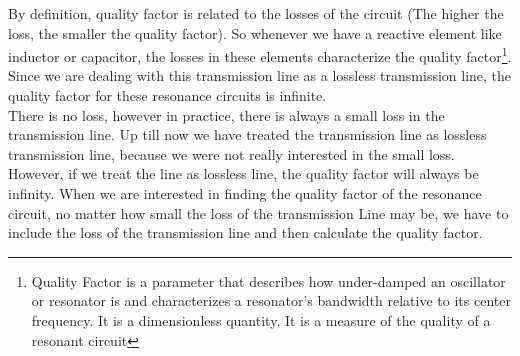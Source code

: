 By definition, quality factor is related to the losses of the circuit (The higher the loss, the smaller the quality factor). So whenever we have a reactive element like inductor or capacitor, the losses in these elements characterize the quality factor\footnote{Quality Factor is a parameter that describes how under-damped an oscillator or resonator is and characterizes a resonator's bandwidth relative to its center frequency. It is a dimensionless quantity.
It is a measure of the quality of a resonant circuit}. Since we are dealing with this transmission line as a lossless transmission line, the quality factor for these resonance circuits is infinite.\\
There is no loss, however in practice, there is always a small loss in the transmission line. Up till now we have treated the transmission line as lossless transmission line, because we were not really interested in the small loss. However, if we treat the line as lossless line, the quality factor will always be infinity. When we are interested in finding the quality factor of the resonance circuit, no matter how small the loss of the transmission
Line may be, we have to include the loss of the transmission line and then calculate the quality factor.
